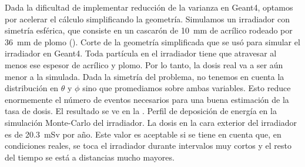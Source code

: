 Dada la dificultad de implementar reducción de la varianza en Geant4,
optamos por acelerar el cálculo simplificando la geometría.
Simulamos un irradiador con simetría esférica,
que consiste en un cascarón de \SI{10}{\milli\meter} de acrílico rodeado por
\SI{36}{\milli\meter} de plomo (). 
{Corte de la geometría simplificada que se usó para simular el irradiador en
Geant4.}
Toda partícula en el irradiador tiene que atravesar al menos ese espesor de
acrílico y plomo.
Por lo tanto, la dosis real va a ser aún menor a la simulada.
Dada la simetría del problema, no tenemos en cuenta la distribución en
$\theta$ y $\phi$ sino que promediamos sobre ambas variables.
Esto reduce enormemente el número de eventos necesarios para una buena
estimación de la tasa de dosis.
El resultado se ve en la .
{Perfil de deposición de energía en la simulación Monte-Carlo del irradiador.}
La dosis en la cara exterior del irradiador es
de \SI{20.3}{\milli\sievert} por año.
Este valor es aceptable si se tiene en cuenta que,
en condiciones reales, se toca el irradiador durante intervalos muy cortos
y el resto del tiempo se está a distancias mucho mayores.
